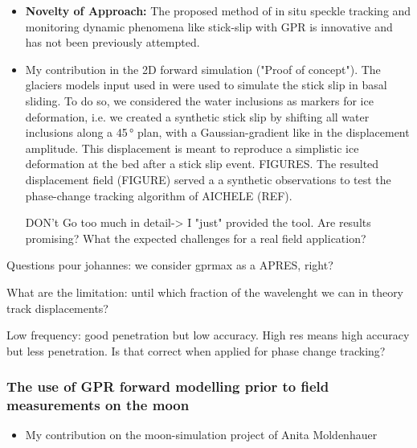 \begin{itemize}
    \item \textbf{Novelty of Approach:} The proposed method of in situ speckle tracking and monitoring dynamic phenomena like stick-slip with GPR is innovative and has not been previously attempted.
    \item My contribution in the 2D forward simulation ("Proof of concept").
    The glaciers models input used in \cite{Ogier&al2023} were used to simulate the stick slip in basal sliding. To do so, we considered the water inclusions as markers for ice deformation, i.e. we created a synthetic stick slip by shifting all water inclusions along a 45\,° plan, with a Gaussian-gradient like in the displacement amplitude. This displacement is meant to reproduce a simplistic ice deformation at the bed after a stick slip event. FIGURES. The resulted displacement field (FIGURE) served a a synthetic observations to test the phase-change tracking algorithm of AICHELE (REF).

    DON't Go too much in detail-> I "just" provided the tool.
    Are results promising? What the expected challenges for a real field application?
\end{itemize}








Questions pour johannes: we consider gprmax as a APRES, right?

What are the limitation: until which fraction of the wavelenght we can in theory track displacements?

Low frequency: good penetration but low accuracy. High res means high accuracy but less penetration. Is that correct when applied for phase change tracking?


\subsubsection{The use of GPR forward modelling prior to field measurements on the moon}

\begin{itemize}
    \item My contribution on the moon-simulation project of Anita Moldenhauer
\end{itemize}



